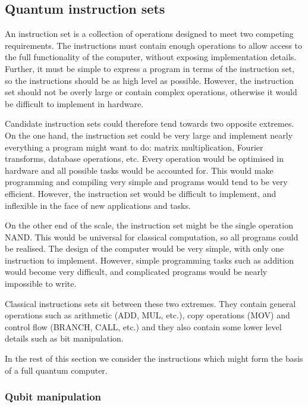 \subsection{Quantum instruction sets}
\label{sec:qinstructions}

An instruction set is a collection of operations designed to meet two competing requirements. The instructions must contain enough operations to allow access to the full functionality of the computer, without exposing implementation details. Further, it must be simple to express a program in terms of the instruction set, so the instructions should be as high level as possible. However, the instruction set should not be overly large or contain complex operations, otherwise it would be difficult to implement in hardware.

Candidate instruction sets could therefore tend towards two opposite extremes. On the one hand, the instruction set could be very large and implement nearly everything a program might want to do: matrix multiplication, Fourier transforms, database operations, etc. Every operation would be optimised in hardware and all possible tasks would be accounted for. This would make programming and compiling very simple and programs would tend to be very efficient. However, the instruction set would be difficult to implement, and inflexible in the face of new applications and tasks.

On the other end of the scale, the instruction set might be the single operation NAND. This would be universal for classical computation, so all programs could be realised. The design of the computer would be very simple, with only one instruction to implement. However, simple programming tasks such as addition would become very difficult, and complicated programs would be nearly impossible to write.

Classical instructions sets sit between these two extremes. They contain general operations such as arithmetic (ADD, MUL, etc.), copy operations (MOV) and control flow (BRANCH, CALL, etc.) and they also contain some lower level details such as bit manipulation. 

In the rest of this section we consider the instructions which might form the basis of a full quantum computer.


\subsubsection{Qubit manipulation}

